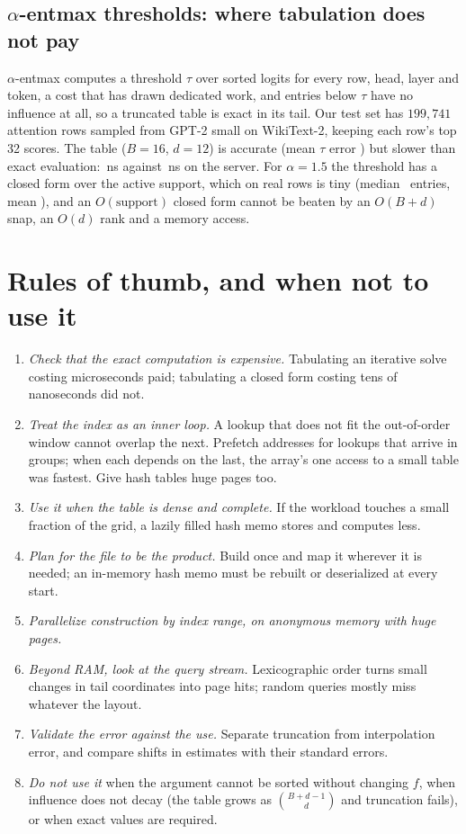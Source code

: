 \documentclass[preprint,12pt]{elsarticle}
\begin{document}
\subsection{$\alpha$-entmax thresholds: where tabulation does not pay}\label{sec:app-entmax}
$\alpha$-entmax\cite{peters2019} computes a threshold $\tau$ over sorted logits for
every row, head, layer and token, a cost that has drawn dedicated
work,\cite{goncalves2025} and entries below $\tau$ have no influence at all, so a
truncated table is exact in its tail. Our test set has $199{,}741$ attention rows
sampled from GPT-2 small on WikiText-2, keeping each row's top 32 scores. The table ($B=16$, $d=12$) is accurate (mean
$\tau$ error \hEntErr) but slower than exact evaluation: \hEntMemo\,ns against
\hEntExact\,ns on the server. For $\alpha=1.5$ the threshold has a closed form
over the active support, which on real rows is tiny (median \hEntSuppMed\ entries,
mean \hEntSuppMean), and an $O(\text{support})$ closed form cannot be beaten by an
$O(B{+}d)$ snap, an $O(d)$ rank and a memory access.

\section{Rules of thumb, and when not to use it}\label{sec:rules}
\begin{enumerate}
\item \emph{Check that the exact computation is expensive.} Tabulating an iterative solve costing microseconds paid; tabulating a closed form costing tens of nanoseconds did not.
\item \emph{Treat the index as an inner loop.} A lookup that does not fit the out-of-order window cannot overlap the next. Prefetch addresses for lookups that arrive in groups; when each depends on the last, the array's one access to a small table was fastest. Give hash tables huge pages too.
\item \emph{Use it when the table is dense and complete.} If the workload touches a small fraction of the grid, a lazily filled hash memo stores and computes less.
\item \emph{Plan for the file to be the product.} Build once and map it wherever it is needed; an in-memory hash memo must be rebuilt or deserialized at every start.
\item \emph{Parallelize construction by index range, on anonymous memory with huge
pages.}
\item \emph{Beyond RAM, look at the query stream.} Lexicographic order turns small changes in tail coordinates into page hits; random queries mostly miss whatever the layout.
\item \emph{Validate the error against the use.} Separate truncation from interpolation error, and compare shifts in estimates with their standard errors.
\item \emph{Do not use it} when the argument cannot be sorted without changing
$f$, when influence does not decay (the table grows as $\binom{B+d-1}{d}$ and
truncation fails), or when exact values are required.
\end{enumerate}
\end{document}
